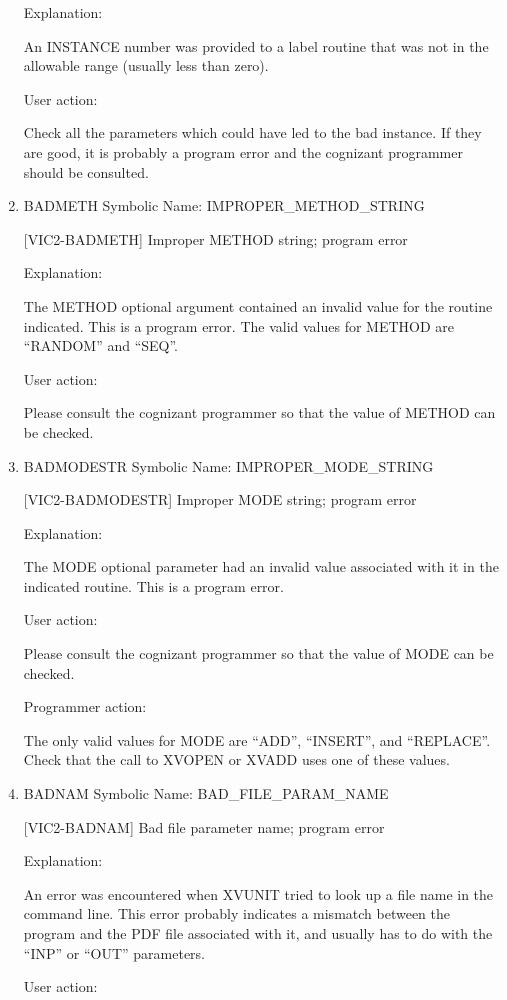 \begin{enumerate}
Explanation:

An INSTANCE number was provided to a label routine that was not
in the allowable range (usually less than zero).

User action:

Check all the parameters which could have led to the bad instance.
If they are good, it is probably a program error and the cognizant
programmer should be consulted.


\item BADMETH Symbolic Name: IMPROPER\_METHOD\_STRING

[VIC2-BADMETH] Improper METHOD string; program error

Explanation:

The METHOD optional argument contained an invalid value for the
routine indicated.  This is a program error.  The valid values for
METHOD are ``RANDOM'' and ``SEQ''.

User action:

Please consult the cognizant programmer so that the value of
METHOD can be checked.


\item BADMODESTR Symbolic Name: IMPROPER\_MODE\_STRING

[VIC2-BADMODESTR] Improper MODE string; program error

Explanation:

The MODE optional parameter had an invalid value associated
with it in the indicated routine.  This is a program error.

User action:

Please consult the cognizant programmer so that the value of
MODE can be checked.

Programmer action:

The only valid values for MODE are ``ADD'', ``INSERT'',
and ``REPLACE''.  Check that the call to XVOPEN or XVADD uses
one of these values.


\item BADNAM Symbolic Name: BAD\_FILE\_PARAM\_NAME

[VIC2-BADNAM] Bad file parameter name; program error

Explanation:

An error was encountered when XVUNIT tried to look up a file
name in the command line.  This error probably indicates a
mismatch between the program and the PDF file associated with it,
and usually has to do with the ``INP'' or ``OUT'' parameters.

User action:


\end{enumerate}
